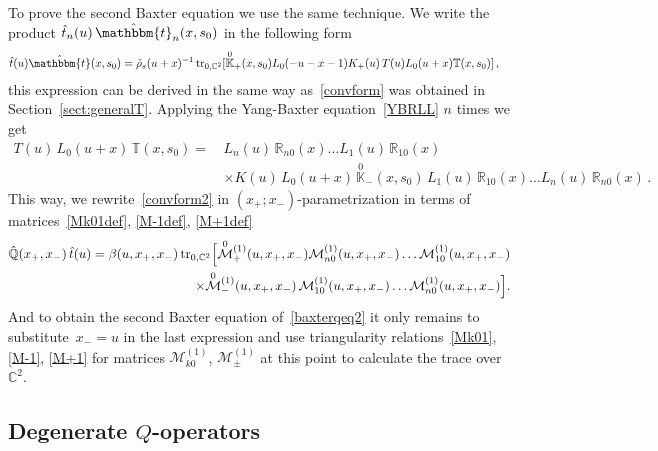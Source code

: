 \documentclass[a4paper,11pt]{article}
\newcommand{\tr}{\mathop{\rm tr}\nolimits}
\numberwithin{equation}{section}
\begin{document}
To prove the second Baxter equation we use the same technique. We write the product $\hat{t}_n(u)\,\hat{\mathbbm{t}}_n(x,s_0)$ in the following form
\begin {align}\label{convform2}
	&\hat{t}(u)\hat{\mathbbm{t}}(x,s_0)  = \tilde{\rho}_{s}(u+x)^{-1}\tr_{0,\mathbb{C}^2}[\overset{0}{\mathbb{K}}_+(x,s_0)L_0(-u-x-1)K_+(u)\,T(u)L_0(u+x)\mathbb{T}(x,s_0) ] \,,
\end{align}
this expression can be derived in the same way as~\eqref{convform} was obtained in Section~\ref{sect:generalT}.
Applying the Yang-Baxter equation~\eqref{YBRLL} $n$ times we get
\begin{align*}
	T(u)\,L_0(u+x)\,\mathbb{T}(x,s_0) = \, & L_n(u)\,\mathbb{R}_{n0}(x) \dots L_1(u)\,\mathbb{R}_{10}(x) \\
	& \times 
	K(u)\,L_0(u+x)\,\overset{0}{\mathbb{K}}_-(x,s_0) \, L_1(u)\,\mathbb{R}_{10}(x) \dots L_n(u)\,\mathbb{R}_{n0}(x) \,.
\end{align*}
This way, we rewrite~\eqref{convform2} in $(x_+;x_-)$-parametrization in terms of matrices~\eqref{Mk01def}, \eqref{M-1def}, \eqref{M+1def}
\begin{align}
	\nonumber
	\hat{\mathbb{Q}}(x_+,x_-)\,\hat{t}(u) = \beta(u,x_+,x_-) 
	\tr_{0,\mathbb{C}^2}\Bigl[
	\overset{0}{\mathcal{M}}{}^{(1)}_+(u,x_+,x_-) \mathcal{M}^{(1)}_{n0}(u,x_+,x_-) \dots \mathcal{M}^{(1)}_{10}(u,x_+,x_-) \\
	\nonumber
	\times \overset{0}{\mathcal{M}}{}^{(1)}_-(u,x_+,x_-)\, \mathcal{M}^{(1)}_{10}(u,x_+,x_-) \dots \mathcal{M}^{(1)}_{n0}(u,x_+,x_-) \Bigr].
\end{align}
And to obtain the second Baxter equation of~\eqref{baxterqeq2} it only remains to substitute~$x_-=u$ in the last expression and use triangularity relations~\eqref{Mk01}, \eqref{M-1}, \eqref{M+1} for matrices $\mathcal{M}^{(1)}_{k0}$, $\mathcal{M}^{(1)}_\pm$ at this point to calculate the trace over~$\mathbb{C}^2$.


\subsection{Degenerate $Q$-operators}
\end{document}
